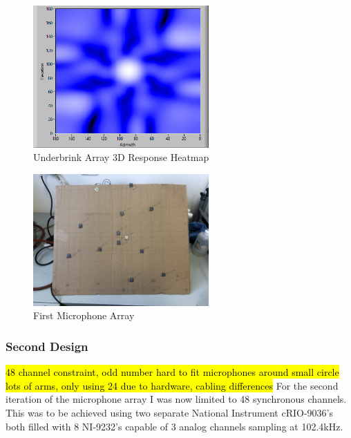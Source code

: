 \documentclass{UoNMCHA}
\numberwithin{equation}{section}
\begin{document}
    \begin{figure} [H]
        \centering
        \includegraphics[keepaspectratio, width = 0.6\textwidth]{Figures/3DHeat12mm.png}
        \caption{Underbrink Array 3D Response Heatmap}
        \label{fig:UnderbrinkHeatmap}
    \end{figure}
        
    \begin{figure} [H]
        \centering
        \includegraphics[keepaspectratio, width = 0.6\textwidth]{Figures/CardboardArray.jpeg}
        \caption{First Microphone Array}
        \label{fig:TestArray}
    \end{figure}
    
\subsubsection{Second Design} \label{sec:Second Array Design}
    \hl{48 channel constraint, odd number hard to fit microphones around small circle lots of arms, only using 24 due to hardware, cabling differences}
    For the second iteration of the microphone array I was now limited to 48 synchronous channels. This was to be achieved using two separate National Instrument cRIO-9036's both filled with 8 NI-9232's capable of 3 analog channels sampling at 102.4kHz.
    
\end{document}
